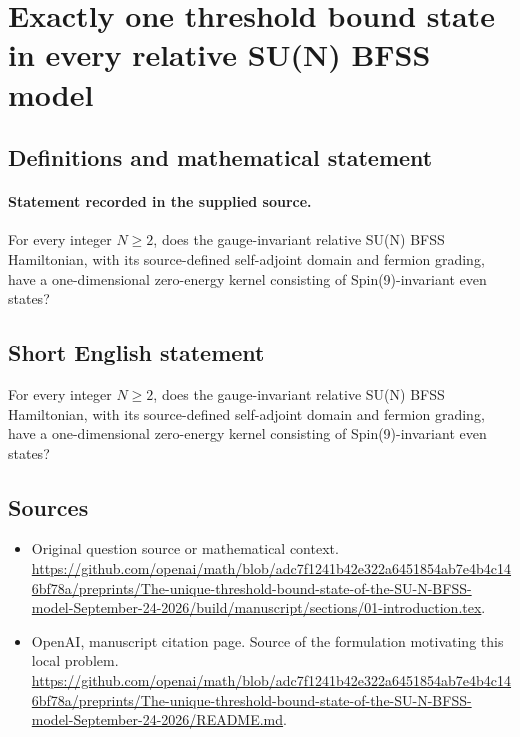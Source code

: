 \documentclass[11pt]{article}
\begin{document}
\section*{Exactly one threshold bound state in every relative SU(N) BFSS model}\label{30007210}
\subsection{Definitions and mathematical statement}
\paragraph{Statement recorded in the supplied source.}
For every integer $N\geq 2$, does the gauge-invariant relative SU(N) BFSS Hamiltonian, with its source-defined self-adjoint domain and fermion grading, have a one-dimensional zero-energy kernel consisting of Spin(9)-invariant even states?
\subsection{Short English statement}
For every integer $N\geq 2$, does the gauge-invariant relative SU(N) BFSS Hamiltonian, with its source-defined self-adjoint domain and fermion grading, have a one-dimensional zero-energy kernel consisting of Spin(9)-invariant even states?
\subsection{Sources}
\begin{itemize}
\item[S1] Original question source or mathematical context.
\url{https://github.com/openai/math/blob/adc7f1241b42e322a6451854ab7e4b4c146bf78a/preprints/The-unique-threshold-bound-state-of-the-SU-N-BFSS-model-September-24-2026/build/manuscript/sections/01-introduction.tex}.
\item[S2] OpenAI, manuscript citation page. Source of the formulation motivating this local problem.
\url{https://github.com/openai/math/blob/adc7f1241b42e322a6451854ab7e4b4c146bf78a/preprints/The-unique-threshold-bound-state-of-the-SU-N-BFSS-model-September-24-2026/README.md}.
\end{itemize}
\end{document}
